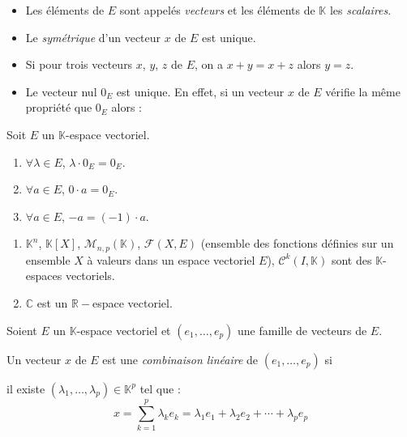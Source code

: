 \documentclass[french,11pt,twoside]{VcCours}
\begin{document}
\begin{Remarques}{}
\begin{itemize}
\item Les éléments de $E$ sont appelés \emph{vecteurs} et les éléments de $\mathbb{K}$ les \emph{scalaires}.
\item Le \emph{symétrique} d'un vecteur $x$ de $E$ est unique. 
\item Si pour trois vecteurs $x$, $y$, $z$ de $E$, on a $x+y=x+z$ alors $y=z$. 
\item Le vecteur nul $0_E$ est unique. En effet, si un vecteur $x$ de $E$ vérifie la même propriété que $0_E$ alors :

\vspace{1.5cm}
\end{itemize}
\end{Remarques}{}

\begin{Proposition}{}
Soit $E$ un $\mathbb{K}$-espace vectoriel.

\begin{enumerate}
\item $\forall \lambda \in E$, $\lambda \cdot 0_E= 0_E$.
\item $\forall a \in E$, $0 \cdot a=0_E$.
\item $\forall a \in E$, $-a=(-1) \cdot a$.
\end{enumerate}
\end{Proposition}

\medskip

\begin{Exemples}
\begin{enumerate}
\item $\mathbb{K}^n$, $\mathbb{K}[X]$, $\mathcal{M}_{n,p}(\mathbb{K})$, $\mathcal{F}(X,E)$ (ensemble des fonctions définies sur un ensemble $X$ à valeurs dans un espace vectoriel $E$), $\mathcal{C}^k(I, \mathbb{K})$ sont des $\mathbb{K}$-espaces vectoriels.
\item $\mathbb{C}$ est un $\mathbb{R}-$espace vectoriel.
\end{enumerate}
\end{Exemples}

\medskip

\begin{Definition}{} Soient $E$ un $\mathbb{K}$-espace vectoriel et $(e_1, \ldots, e_p)$ une famille de vecteurs de $E$.

Un vecteur $x$ de $E$ est une \emph{combinaison linéaire} de $(e_1, \ldots, e_p)$ si 

{il existe $(\lambda_1, \ldots, \lambda_p) \in \mathbb{K}^p$ tel que :}
$$ {x = \sum_{k=1}^p \lambda_k e_k = \lambda_1 e_1 + \lambda_2 e_2 + \cdots + \lambda_p e_p }$$
\end{Definition}
\end{document}
